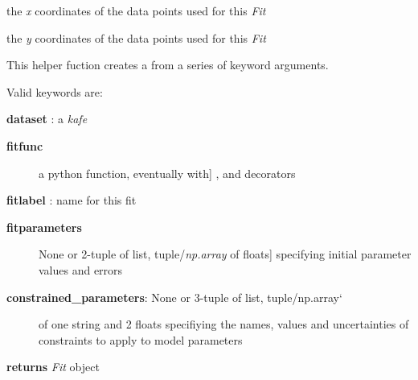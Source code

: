 \documentclass[a4paper,10pt,english]{sphinxmanual}
\begin{document}
\begin{fulllineitems}
\begin{fulllineitems}
\begin{description}
\end{description}

\end{fulllineitems}


\begin{fulllineitems}
\label{index:kafe.fit.Fit.xdata}
the \emph{x} coordinates of the data points used for this \emph{Fit}

\end{fulllineitems}


\begin{fulllineitems}
\label{index:kafe.fit.Fit.ydata}
the \emph{y} coordinates of the data points used for this \emph{Fit}

\end{fulllineitems}


\end{fulllineitems}


\begin{fulllineitems}
\label{index:kafe.fit.build_fit}
This helper fuction creates a  from a series of keyword arguments.

Valid keywords are:

\textbf{dataset} : a \emph{kafe} 
\begin{description}
\item[{\textbf{fitfunc}}] \leavevmode{[}a python function, eventually with{]}
,  and  decorators

\end{description}

\textbf{fitlabel} : name for this fit
\begin{description}
\item[{\textbf{fitparameters}}] \leavevmode{[}None or 2-tuple of list, tuple/\emph{np.array} of floats{]}
specifying initial parameter values and errors

\item[{\textbf{constrained\_parameters}: None or 3-tuple of list, tuple/np.array{}`}] \leavevmode
of one string and 2 floats specifiying the names, values and
uncertainties of constraints to apply to model parameters

\end{description}

\textbf{returns} \emph{Fit} object

\end{fulllineitems}
\end{document}
